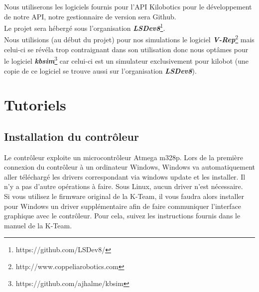 \documentclass[a4paper,8pt]{report}
\begin{document}
Nous utiliserons les logiciels fournis pour l'API Kilobotics pour le d\'eveloppement de notre API, notre gestionnaire de version sera Github.\\
Le projet sera h\'eberg\'e sous l'organisation \textit{\textbf{LSDev8}}\footnote{https://github.com/LSDev8/}.\\
Nous utilisions (au d\'ebut du projet) pour nos simulations le logiciel \textit{\textbf{V-Rep}}\footnote{http://www.coppeliarobotics.com} mais celui-ci se r\'ev\'ela trop contraignant dans son utilisation donc nous opt\^ames pour le logiciel \textit{\textbf{kbsim}}\footnote{https://github.com/ajhalme/kbsim} car celui-ci est un simulateur exclusivement pour kilobot (une copie de ce logiciel se trouve aussi sur l'organisation \textit{\textbf{LSDev8}}).\\


\section*{Tutoriels}\label{sec:name}

\subsection*{Installation du contr\^oleur}\label{sec:name}

Le contr\^oleur exploite un microcontr\^oleur Atmega m328p. Lors de la première connexion du contr\^oleur \`a un ordinateur Windows, Windows va automatiquement aller t\'el\'echarg\'e les drivers correspondant via windows update et les installer. Il n'y a pas d'autre op\'erations \`a faire. Sous Linux, aucun driver n'est n\'ecessaire.\\
Si vous utilisez le firmware original de la K-Team, il vous faudra alors installer pour Windows un driver suppl\'ementaire afin de faire communiquer l'interface graphique avec le contr\^oleur. Pour cela, suivez les instructions fournis dans le manuel de la K-Team.

\begin{center}
\end{center}
\end{document}
